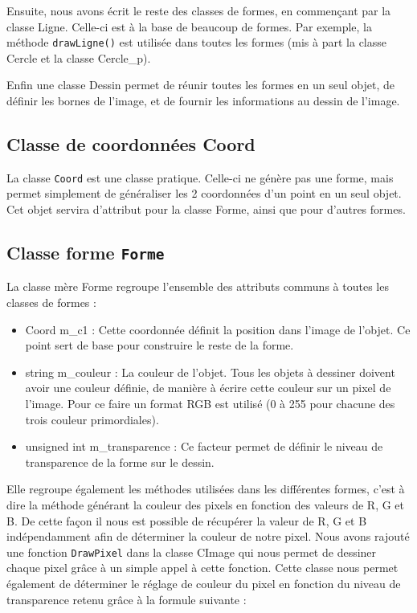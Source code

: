 \documentclass[11pt]{article}
\begin{document}
Ensuite, nous avons écrit le reste des classes de formes, en commençant par la classe Ligne. Celle-ci est à la base de beaucoup de formes. Par exemple, la méthode \texttt{drawLigne()} est utilisée dans toutes les formes (mis à part la classe Cercle et la classe Cercle\_p).

Enfin une classe Dessin permet de réunir toutes les formes en un seul objet, de définir les bornes de l'image, et de fournir les informations au dessin de l'image. 

\subsection{Classe de coordonnées Coord}

La classe \texttt{Coord} est une classe pratique. Celle-ci ne génère pas une forme, mais permet simplement de généraliser les 2 coordonnées d'un point en un seul objet. Cet objet servira d'attribut pour la classe Forme, ainsi que pour d'autres formes. 

\subsection{Classe forme \texttt{Forme}}

La classe mère Forme regroupe l'ensemble des attributs communs à toutes les classes de formes :

\begin{itemize}
    \item Coord m\_c1 : Cette coordonnée définit la position dans l'image de l'objet. Ce point sert de base pour construire le reste de la forme. 
    \item string m\_couleur : La couleur de l'objet. Tous les objets à dessiner doivent avoir une couleur définie, de manière à écrire cette couleur sur un pixel de l'image. Pour ce faire un format RGB est utilisé (0 à 255 pour chacune des trois couleur primordiales). 
    \item unsigned int m\_transparence : Ce facteur permet de définir le niveau de transparence de la forme sur le dessin. 
\end{itemize}

Elle regroupe également les méthodes utilisées dans les différentes formes, c'est à dire la méthode générant la couleur des pixels en fonction des valeurs de R, G et B. De cette façon il nous est possible de récupérer la valeur de R, G et B indépendamment afin de déterminer la couleur de notre pixel. Nous avons rajouté une fonction \texttt{DrawPixel} dans la classe CImage qui nous permet de dessiner chaque pixel grâce à un simple appel à cette fonction. Cette classe nous permet également de déterminer le réglage de couleur du pixel en fonction du niveau de transparence retenu grâce à la formule suivante : 
\end{document}
